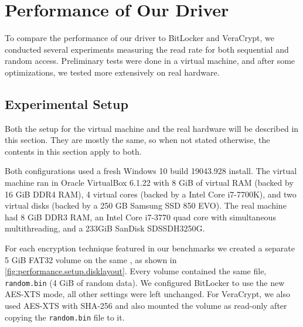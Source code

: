 \chapter{Performance of Our Driver}
\label{chap:performance}

To compare the performance of our driver to BitLocker and VeraCrypt, we conducted several experiments measuring the read rate for both sequential and random access. Preliminary tests were done in a virtual machine, and after some optimizations, we tested more extensively on real hardware.

\section{Experimental Setup}
\label{chap:performance.setup}
Both the setup for the virtual machine and the real hardware will be described in this section. They are mostly the same, so when not stated otherwise, the contents in this section apply to both.

Both configurations used a fresh Windows 10 build 19043.928 install. The virtual machine ran in Oracle VirtualBox 6.1.22 with 8 GiB of virtual RAM (backed by 16 GiB DDR4 RAM), 4 virtual cores (backed by a Intel Core i7-7700K), and two virtual disks (backed by a 250 GB Samsung SSD 850 EVO). The real machine had 8 GiB DDR3 RAM, an Intel Core i7-3770 quad core with simultaneous multithreading, and a 233GiB SanDisk SDSSDH3250G. 

For each encryption technique featured in our benchmarks we created a separate 5 GiB FAT32 volume on the same , as shown in \autoref{fig:performance.setup.disklayout}. Every volume contained the same file, \texttt{random.bin} (4 GiB of random data).  We configured BitLocker to use the new AES-XTS mode, all other settings were left unchanged. For VeraCrypt, we also used AES-XTS with SHA-256 and also mounted the volume as read-only after copying the \texttt{random.bin} file to it.

